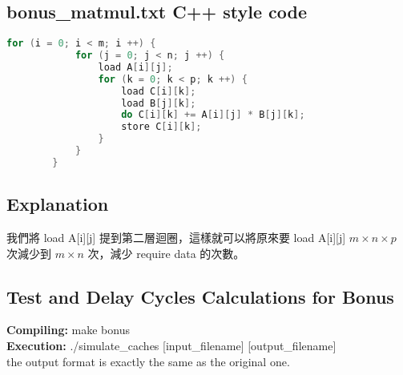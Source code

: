 \documentclass[12pt, a4paper]{article}
\begin{document}
\begin{CJK*}{UTF8}{bsmi}
        \subsection{bonus\_matmul.txt C++ style code} 
        \begin{lstlisting}[language=C++]
        for (i = 0; i < m; i ++) {
            for (j = 0; j < n; j ++) {
                load A[i][j];
                for (k = 0; k < p; k ++) {
                    load C[i][k];
                    load B[j][k];
                    do C[i][k] += A[i][j] * B[j][k];
                    store C[i][k];
                }
            }
        }
        \end{lstlisting}
        
        \newpage
        \subsection{Explanation}
            我們將 load A[i][j] 提到第二層迴圈，這樣就可以將原來要 load A[i][j] $m \times n \times p$ 次減少到 $m \times n$ 次，減少 require data 的次數。
        \subsection{Test and Delay Cycles Calculations for Bonus}
            \textbf{Compiling:} make bonus \\
            \textbf{Execution:} ./simulate\_caches [input\_filename] [output\_filename] \\
            the output format is exactly the same as the original one. \\
            
    \end{CJK*}
\end{document}
